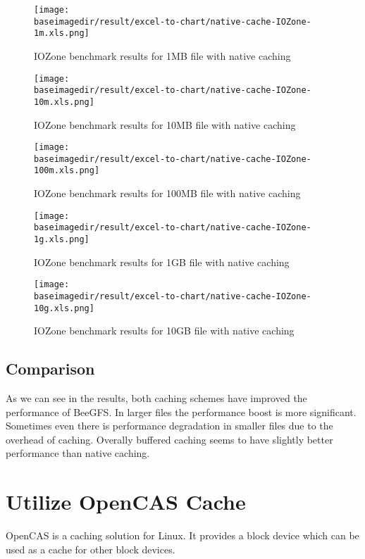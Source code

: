 \documentclass{article}
\newcommand{\baseimagedir}{..}
\begin{document}
\begin{figure}
    \centering
    \texttt{[image: \\baseimagedir/result/excel-to-chart/native-cache-IOZone-1m.xls.png]}
    \caption{IOZone benchmark results for 1MB file with native caching}
    \label{fig:native-IOZone-1m}
\end{figure}

\begin{figure}
    \centering
    \texttt{[image: \\baseimagedir/result/excel-to-chart/native-cache-IOZone-10m.xls.png]}
    \caption{IOZone benchmark results for 10MB file with native caching}
    \label{fig:native-IOZone-10m}
\end{figure}

\begin{figure}
    \centering
    \texttt{[image: \\baseimagedir/result/excel-to-chart/native-cache-IOZone-100m.xls.png]}
    \caption{IOZone benchmark results for 100MB file with native caching}
    \label{fig:native-IOZone-100m}
\end{figure}

\begin{figure}
    \centering
    \texttt{[image: \\baseimagedir/result/excel-to-chart/native-cache-IOZone-1g.xls.png]}
    \caption{IOZone benchmark results for 1GB file with native caching}
    \label{fig:native-IOZone-1g}
\end{figure}

\begin{figure}
    \centering
    \texttt{[image: \\baseimagedir/result/excel-to-chart/native-cache-IOZone-10g.xls.png]}
    \caption{IOZone benchmark results for 10GB file with native caching}
    \label{fig:native-IOZone-10g}
\end{figure}

\subsection{Comparison}
As we can see in the results, both caching schemes have improved the performance of BeeGFS. In larger files the performance boost is more significant. Sometimes even there is performance degradation in smaller files due to the overhead of caching. Overally buffered caching seems to have slightly better performance than native caching. 

\section{Utilize OpenCAS Cache}
OpenCAS is a caching solution for Linux. It provides a block device which can be used as a cache for other block devices.
\end{document}

